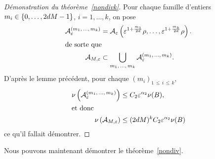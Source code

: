 \documentclass[AHL,Unicode,longabstracts,francais,published]{cedram}
\newcommand{\cA}{\mathcal{A}}
\newcommand{\eps}{\varepsilon}
\begin{document}
\begin{proof}[Démonstration du théorème~\ref{nondivk}]
Pour chaque famille d'entiers $m_i\in\{0,\dots,\linebreak2dM -1\}$, $i=1,\dots,k$, on pose
\begin{align*}
\cA_\eps^{\left(m_1,\,\dots,\,m_k\right)} &= \cA_\eps\left(\eps^{1+\frac{m_1}{2d}}\rho,\dots,\eps^{1+\frac{m_k}{2d}}\rho\right).
\\
\intertext{de sorte que}
\cA_{M,\eps} &\subset \bigcup_{m_1,\,\dots,\,m_k} \cA_\eps^{\left(m_1,\,\dots,\,m_k\right)}.
\end{align*}
D'après le lemme précédent, pour chaque $(m_i)_{1\,\leq\,i\,\leq\,k}$,
\begin{align*}
\nu\left(\cA_\eps^{\left(m_1,\,\dots,\,m_k\right)}\right)&\leq C_2\eps^{\alpha_2}\nu(B),
\\
\intertext{et donc}
\nu\left(\cA_{M,\eps}\right) &\leq (2dM)^kC_2\eps^{\alpha_2}\nu(B)
\end{align*}
ce qu'il fallait démontrer.
\end{proof}

Nous pouvons maintenant démontrer le théorème~\ref{nondiv}.
\end{document}
